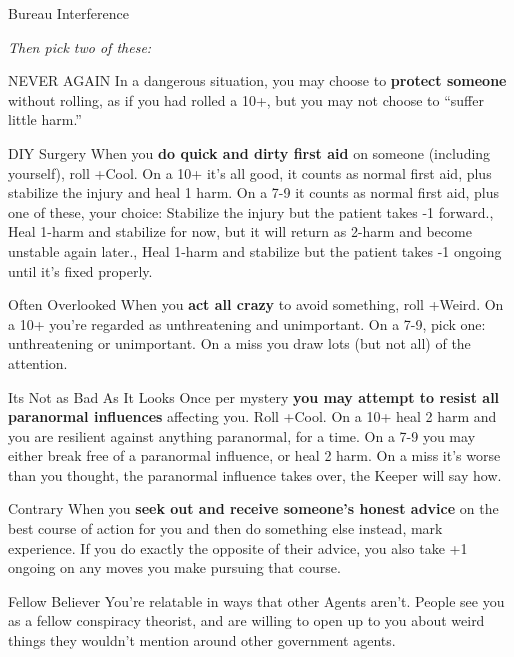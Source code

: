 {\begin{minipage}[t]{0.94\linewidth}
\begin{move}{Bureau Interference}
\end{move}
%
\end{minipage}
%
}{%
%
\textit{Then pick two of these:}
%
\begin{move}{NEVER AGAIN}
In a dangerous situation, you may choose to \textbf{protect someone} without rolling, as if you had rolled a 10+, but you may not choose to “suffer little harm.”
\end{move}%
\br[1mm]
%
\begin{move}{DIY Surgery}
When you \textbf{do quick and dirty first aid} on someone (including yourself), roll +Cool. On a 10+ it’s all good, it counts as normal first aid, plus stabilize the injury and heal 1 harm. On a 7-9 it counts as normal first aid, plus one of these, your choice:
\holdoptions%
    {{Stabilize the injury but the patient takes -1 forward.},
    {Heal 1-harm and stabilize for now, but it will return as 2-harm and become unstable again later.},
    {Heal 1-harm and stabilize but the patient takes -1 ongoing until it’s fixed properly.}}
\end{move}%
\br[1mm]
%
\begin{move}{Often Overlooked}
When you \textbf{act all crazy} to avoid something, roll +Weird.  On a 10+ you’re regarded as unthreatening and unimportant.  On a 7-9, pick one: unthreatening or unimportant.  On a miss you draw lots (but not all) of the attention.
\end{move}%
\br[1mm]
%
\begin{move}{Its Not as Bad As It Looks}
Once per mystery \textbf{you may attempt to resist all paranormal influences} affecting you.  Roll +Cool.  On a 10+ heal 2 harm and you are resilient against anything paranormal, for a time.  On a 7-9 you may either break free of a paranormal influence, or heal 2 harm.  On a miss it’s worse than you thought, the paranormal influence takes over, the Keeper will say how.
\end{move}%
\br[1mm]
%
\begin{move}{Contrary}
When you \textbf{seek out and receive someone’s honest advice} on the best course of action for you and then do something else instead, mark experience. If you do exactly the opposite of their advice, you also take +1 ongoing on any moves you make pursuing that course.
\end{move}
%
\begin{move}{Fellow Believer}
You’re relatable in ways that other Agents aren’t.  People see you as a fellow conspiracy theorist, and are willing to open up to you about weird things they wouldn’t mention around other government agents.
\end{move}
%
}\pagebreak%
